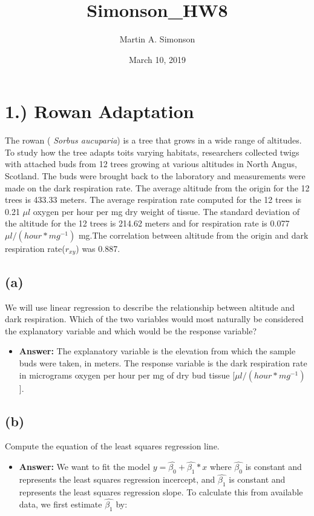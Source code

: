 \documentclass[]{article}
\title{Simonson\_HW8}
\author{Martin A. Simonson}
\date{March 10, 2019}
\providecommand{\tightlist}{%
  \setlength{\itemsep}{0pt}\setlength{\parskip}{0pt}}
\begin{document}
\maketitle

\section{1.) Rowan Adaptation}\label{rowan-adaptation}

The rowan ( \emph{Sorbus aucuparia}) is a tree that grows in a wide
range of altitudes. To study how the tree adapts toits varying habitats,
researchers collected twigs with attached buds from 12 trees growing at
various altitudes in North Angus, Scotland. The buds were brought back
to the laboratory and measurements were made on the dark respiration
rate. The average altitude from the origin for the 12 trees is 433.33
meters. The average respiration rate computed for the 12 trees is 0.21
\(\mu l\) oxygen per hour per mg dry weight of tissue. The standard
deviation of the altitude for the 12 trees is 214.62 meters and for
respiration rate is 0.077 \(\mu l/(hour*mg^{-1})\) mg.The correlation
between altitude from the origin and dark respiration rate(\(r_{xy}\))
was 0.887.

\subsection{(a)}\label{a}

We will use linear regression to describe the relationship between
altitude and dark respiration. Which of the two variables would most
naturally be considered the explanatory variable and which would be the
response variable?

\begin{itemize}
\tightlist
\item
  \textbf{Answer:} The explanatory variable is the elevation from which
  the sample buds were taken, in meters. The response variable is the
  dark respiration rate in micrograms oxygen per hour per mg of dry bud
  tissue {[}\(\mu l/(hour*mg^{-1})\){]}.
\end{itemize}

\subsection{(b)}\label{b}

Compute the equation of the least squares regression line.

\begin{itemize}
\tightlist
\item
  \textbf{Answer:} We want to fit the model
  \(y=\hat{\beta_0} + \hat{\beta_1}*x\) where \(\hat{\beta_0}\) is
  constant and represents the least squares regression incercept, and
  \(\hat{\beta_1}\) is constant and represents the least squares
  regression slope. To calculate this from available data, we first
  estimate \(\hat{\beta_1}\) by:
\end{itemize}
\end{document}
